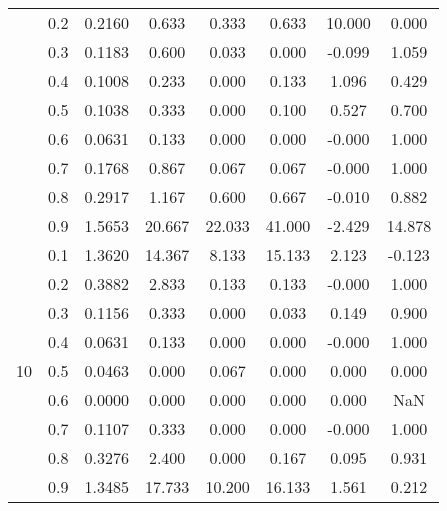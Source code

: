 \documentclass[11pt,a4paper]{report}
\begin{document}
\begin{longtable}{ | c | c || c | c | c | c | c | c | }
 & 0.2 & 0.2160 & 0.633 & 0.333 & 0.633 & 10.000 & 0.000 \\
 & 0.3 & 0.1183 & 0.600 & 0.033 & 0.000 & -0.099 & 1.059 \\
 & 0.4 & 0.1008 & 0.233 & 0.000 & 0.133 & 1.096 & 0.429 \\
 & 0.5 & 0.1038 & 0.333 & 0.000 & 0.100 & 0.527 & 0.700 \\
 & 0.6 & 0.0631 & 0.133 & 0.000 & 0.000 & -0.000 & 1.000 \\
 & 0.7 & 0.1768 & 0.867 & 0.067 & 0.067 & -0.000 & 1.000 \\
 & 0.8 & 0.2917 & 1.167 & 0.600 & 0.667 & -0.010 & 0.882 \\
 & 0.9 & 1.5653 & 20.667 & 22.033 & 41.000 & -2.429 & 14.878 \\
 \hline
\multirow{9}{*}{10} & 0.1 & 1.3620 & 14.367 & 8.133 & 15.133 & 2.123 & -0.123 \\
 & 0.2 & 0.3882 & 2.833 & 0.133 & 0.133 & -0.000 & 1.000 \\
 & 0.3 & 0.1156 & 0.333 & 0.000 & 0.033 & 0.149 & 0.900 \\
 & 0.4 & 0.0631 & 0.133 & 0.000 & 0.000 & -0.000 & 1.000 \\
 & 0.5 & 0.0463 & 0.000 & 0.067 & 0.000 & 0.000 & 0.000 \\
 & 0.6 & 0.0000 & 0.000 & 0.000 & 0.000 & 0.000 & NaN \\
 & 0.7 & 0.1107 & 0.333 & 0.000 & 0.000 & -0.000 & 1.000 \\
 & 0.8 & 0.3276 & 2.400 & 0.000 & 0.167 & 0.095 & 0.931 \\
 & 0.9 & 1.3485 & 17.733 & 10.200 & 16.133 & 1.561 & 0.212 \\
 \hline
\hline
\end{longtable}
\end{document}
